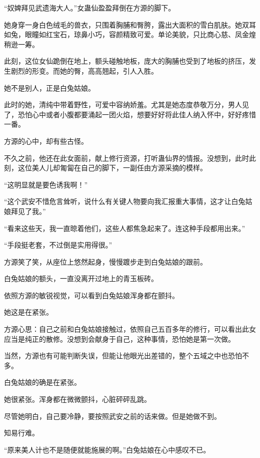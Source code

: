 
\begin{this_body}

“奴婢拜见武遗海大人。”女蛊仙盈盈拜倒在方源的脚下。

她身穿一身白色绒毛的兽衣，只围着胸脯和臀胯，露出大面积的雪白肌肤。她双耳如兔，眼瞳如红宝石，琼鼻小巧，容颜精致可爱。单论美貌，只比商心慈、凤金煌稍逊一筹。

此刻，这位女仙跪倒在地上，额头碰触地板，庞大的胸脯也受到了地板的挤压，发生剧烈的形变。而她的臀，高高翘起，引人入胜。

她不是别人，正是白兔姑娘。

此时的她，清纯中带着野性，可爱中容纳娇羞。尤其是她态度恭敬万分，男人见了，恐怕心中或者小腹都要涌起一团火焰，想要好好将此佳人纳入怀中，好好疼惜一番。

方源的心中，却有些古怪。

不久之前，他还在此女面前，献上修行资源，打听蛊仙界的情报。没想到，此时此刻，这位美人儿却匍匐在自己的脚下，一副任由方源采摘的模样。

“这明显就是要色诱我啊！”

“这个武安不惜危言耸听，说什么有关键人物要向我汇报重大事情，这才让白兔姑娘拜见了我。”

“看来这些天，我一直晾着他们，这些人都焦急起来了。连这种手段都用出来。”

“手段挺老套，不过倒是实用得很。”

方源笑了笑，从座位上悠然起身，慢慢踱步走到白兔姑娘的跟前。

白兔姑娘的额头，一直没离开过地上的青玉板砖。

依照方源的敏锐视觉，可以看到白兔姑娘浑身都在颤抖。

她这是在紧张。

方源心思：自己之前和白兔姑娘接触过，依照自己五百多年的修行，可以看出此女应当是纯正的散修。没想到会献身于自己，这种事情，恐怕她是第一次做。

当然，方源也有可能判断失误，但能让他眼光出差错的，整个五域之中也恐怕不多。

白兔姑娘的确是在紧张。

她很紧张。浑身都在微微颤抖，心脏砰砰乱跳。

尽管她明白，自己要冷静，要按照武安之前的话来做。但是她做不到。

知易行难。

“原来美人计也不是随便就能施展的啊。”白兔姑娘在心中感叹不已。


\end{this_body}
